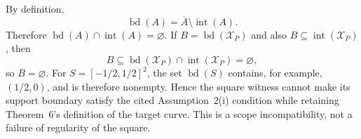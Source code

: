 By definition,
\[
 \operatorname{bd}(A)=\overline A\setminus\operatorname{int}(A).
\]
Therefore \(\operatorname{bd}(A)\cap\operatorname{int}(A)=\varnothing\).  If \(B=\operatorname{bd}(\mathcal X_P)\) and also \(B\subseteq\operatorname{int}(\mathcal X_P)\), then
\[
 B\subseteq\operatorname{bd}(\mathcal X_P)\cap\operatorname{int}(\mathcal X_P)=\varnothing,
\]
so \(B=\varnothing\).  For \(S=[-1/2,1/2]^2\), the set \(\operatorname{bd}(S)\) contains, for example, \((1/2,0)\), and is therefore nonempty.  Hence the square witness cannot make its support boundary satisfy the cited Assumption~2(i) condition while retaining Theorem~6's definition of the target curve.  This is a scope incompatibility, not a failure of regularity of the square.